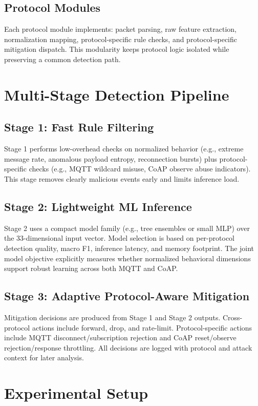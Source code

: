 \documentclass[conference]{IEEEtran}
\begin{document}
\subsection{Protocol Modules}
Each protocol module implements: packet parsing, raw feature extraction, normalization mapping, protocol-specific rule checks, and protocol-specific mitigation dispatch. This modularity keeps protocol logic isolated while preserving a common detection path.

\section{Multi-Stage Detection Pipeline}
\subsection{Stage 1: Fast Rule Filtering}
Stage 1 performs low-overhead checks on normalized behavior (e.g., extreme message rate, anomalous payload entropy, reconnection bursts) plus protocol-specific checks (e.g., MQTT wildcard misuse, CoAP observe abuse indicators). This stage removes clearly malicious events early and limits inference load.

\subsection{Stage 2: Lightweight ML Inference}
Stage 2 uses a compact model family (e.g., tree ensembles or small MLP) over the 33-dimensional input vector. Model selection is based on per-protocol detection quality, macro F1, inference latency, and memory footprint. The joint model objective explicitly measures whether normalized behavioral dimensions support robust learning across both MQTT and CoAP.

\subsection{Stage 3: Adaptive Protocol-Aware Mitigation}
Mitigation decisions are produced from Stage 1 and Stage 2 outputs. Cross-protocol actions include forward, drop, and rate-limit. Protocol-specific actions include MQTT disconnect/subscription rejection and CoAP reset/observe rejection/response throttling. All decisions are logged with protocol and attack context for later analysis.

\section{Experimental Setup}
\end{document}

